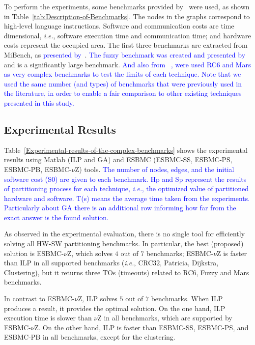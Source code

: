 \documentclass{doublecol-new}
\theoremstyle{TH}{
\newtheorem{lemma}{Lemma}
\newtheorem{theorem}[lemma]{Theorem}
\newtheorem{corrolary}[lemma]{Corrolary}
\newtheorem{conjecture}[lemma]{Conjecture}
\newtheorem{proposition}[lemma]{Proposition}
\newtheorem{claim}[lemma]{Claim}
\newtheorem{stheorem}[lemma]{Wrong Theorem}
\newtheorem{algorithm}{Algorithm}
}
\theoremstyle{THrm}{
\newtheorem{definition}{Definition}[section]
\newtheorem{question}{Question}[section]
\newtheorem{remark}{Remark}
\newtheorem{scheme}{Scheme}
}
\theoremstyle{THhit}{
\newtheorem{case}{Case}[section]
}
\begin{document}
To perform the experiments, some benchmarks provided by~\cite{Mann2007} were used, as shown in Table~\ref{tab:Description-of-Benchmarks}. The nodes in the graphs correspond to high-level language instructions. Software and communication costs are time dimensional, {\it i.e.}, software execution time and communication time; and hardware costs represent the occupied area. The first three benchmarks are extracted from MiBench, as \textcolor{blue}{presented by}~\cite{Guthaus2001}. \textcolor{blue}{The fuzzy benchmark was created and presented by}~\cite{Mann2007} and is a significantly large benchmark. \textcolor{blue}{And also from ~\cite{Mann2007}, were used RC$6$ and Mars as very complex benchmarks to test the limits of each technique. Note that we used the same number (and types) of benchmarks that were previously used in the literature, in order to enable a fair comparison to other existing techniques presented in this study.}

\subsection{Experimental Results}
\label{Experimental-Results}

Table~\ref{Experimental-results-of-the-complex-benchmarks} shows the experimental results using Matlab (ILP and GA) and ESBMC (ESBMC-SS, ESBMC-PS, ESBMC-PB, ESBMC-$\nu$Z) tools. \textcolor{blue}{The number of nodes, edges, and the initial software cost (S0) are given to each benchmark. Hp and Sp represent the results of partitioning process for each technique, {\it i.e.}, the optimized value of partitioned hardware and software. T(s) means the average time taken from the experiments. Particularly about GA there is an additional row informing how far from the exact answer is the found solution.}

As observed in the experimental evaluation, there is no single tool for efficiently solving all HW-SW partitioning benchmarks. In particular, the best (proposed) solution is ESBMC-$\nu$Z, which solves $4$ out of $7$ benchmarks; ESBMC-$\nu$Z is faster than ILP in all supported benchmarks ({\it i.e.}, CRC$32$, Patricia, Dijkstra, Clustering), but it returns three TOs (timeouts) related to RC6, Fuzzy and Mars benchmarks.

In contrast to ESBMC-$\nu$Z, ILP solves $5$ out of $7$ benchmarks. When ILP produces a result, it provides the optimal solution. On the one hand, ILP execution time is slower than $\nu$Z in all benchmarks, which are supported by ESBMC-$\nu$Z. On the other hand, ILP is faster than ESBMC-SS, ESBMC-PS, and ESBMC-PB in all benchmarks, except for the clustering.
\end{document}
